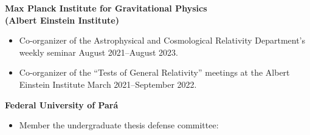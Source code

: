 \documentclass[11pt]{article}
\begin{document}
\textbf{Max Planck Institute for Gravitational Physics \\ (Albert Einstein Institute)}
\begin{itemize}
        \item Co-organizer of the Astrophysical and Cosmological Relativity Department's weekly seminar \hfill August 2021--August 2023.
        \item Co-organizer of the ``Tests of General Relativity'' meetings at the Albert Einstein Institute \hfill March 2021--September 2022.
\end{itemize}

\textbf{Federal University of Par\'a}
\begin{itemize}
    \item Member the undergraduate thesis defense committee:
\end{itemize}


\end{document}
